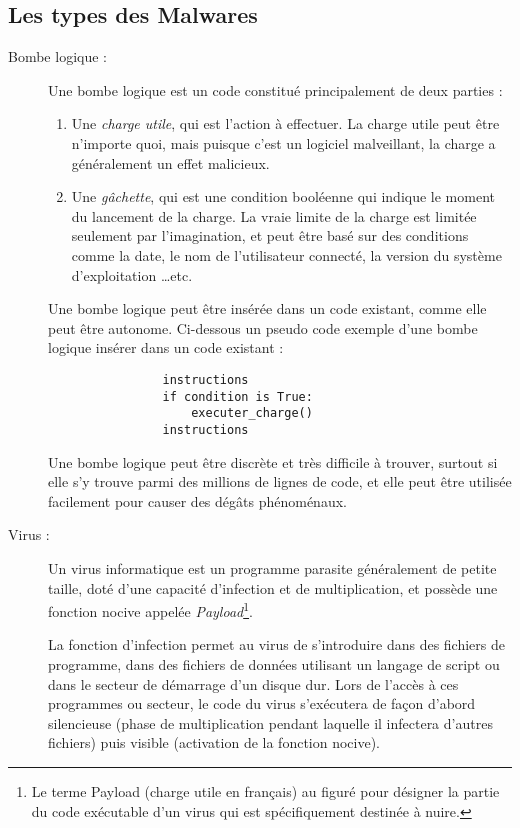     \subsection{Les types des Malwares}
    \begin{description}
        \item[Bombe logique :] Une bombe logique est un code constitué principalement de deux parties :
            \begin{enumerate}
                \item Une \emph{charge utile}, qui est l'action à effectuer. La charge utile peut être n'importe quoi,
                    mais puisque c'est un logiciel malveillant, la charge a généralement un effet malicieux.
                \item Une \emph{gâchette}, qui est une condition booléenne qui indique le moment du lancement de la
                    charge. La vraie limite de la charge est limitée seulement par l'imagination, et peut être basé sur
                    des conditions comme la date, le nom de l'utilisateur connecté, la version du système d'exploitation
                    \ldots etc.
            \end{enumerate}
            Une bombe logique peut être insérée dans un code existant, comme elle peut être autonome. 
            Ci-dessous un pseudo code exemple d'une bombe logique insérer dans un code existant :
            \begin{verbatim}
                instructions
                if condition is True:
                    executer_charge()
                instructions
            \end{verbatim}
            Une bombe logique peut être discrète et très difficile à trouver, surtout si elle s'y trouve parmi des 
            millions de lignes de code, et elle peut être utilisée facilement pour causer des 
            dégâts phénoménaux. \cite{virus} %

        \item[Virus :] Un virus informatique est un programme parasite généralement de petite taille, 
            doté d’une capacité d’infection et de multiplication, et possède une fonction nocive appelée 
            \emph{Payload}\footnote{Le terme Payload (charge utile en français) au figuré pour désigner 
            la partie du code exécutable d'un virus qui est spécifiquement destinée à nuire.}.

            La fonction d'infection permet au virus de s'introduire dans des fichiers de programme, 
            dans des fichiers de données utilisant un langage de script ou dans le secteur de démarrage 
            d’un disque dur. Lors de l'accès à ces programmes ou secteur, le code du virus s'exécutera de 
            façon d'abord silencieuse (phase de multiplication pendant laquelle il infectera d'autres fichiers) 
            puis visible (activation de la fonction nocive). %


\end{description}
